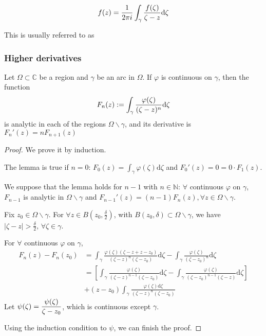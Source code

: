 \[\displaystyle f(z)=\frac{1}{2\pi i}\int_\gamma\frac{f(\zeta)}{\zeta-z}\mathrm{d}\zeta\]

This is usually referred to as 

\subsubsection{Higher derivatives}
\begin{lemma}\label{Lemma of Analytic Properties of integral function}\label{lemma in section 2.3}
    Let  $ \Omega\subset\mathbb{C}$ be a region and  $ \gamma $ be an arc in  $ \Omega $. If  $ \varphi $ is continuous on  $ \gamma $, then the function 
    \[F_n(z):=\displaystyle\int_\gamma\frac{\varphi(\zeta)}{(\zeta-z)^n}\mathrm{d}\zeta\]
    is analytic in each of the regions  $ \Omega\backslash \gamma $, and its derivative is  $ F_n'(z)=nF_{n+1}(z) $
\end{lemma}
\begin{proof}
    We prove it by induction. 
    
    The lemma is true if  $ n=0 $:  $ F_0(z)=\int_\gamma\varphi(\zeta)\mathrm{d}\zeta $ and  $ F_0'(z)=0=0\cdot F_1(z) $.
    
    We suppose that the lemma holds for  $ n-1 $ with  $ n\in \mathbb{N} $:  $ \forall  $ continuous $ \varphi $ on  $ \gamma $,  $ F_{n-1} $ is analytic in  $ \Omega\backslash \gamma $ and  $ F_{n-1}'
    (z)=(n-1)F_n(z),\forall z\in \Omega\backslash \gamma $.
    
    Fix  $ z_0\in \Omega\backslash \gamma $. For  $ \forall z\in B(z_0,\frac{\delta}{2}) $, with  $ B(z_0,\delta)\subset \Omega\backslash \gamma $, we have  $ |\zeta-z|>\frac{\delta}{2},\,\forall \zeta\in \gamma $.
    
    For  $ \forall  $ continuous  $ \varphi $ on  $ \gamma $,  
    \begin{align*}
        F_n(z)-F_n(z_0)&=\int_\gamma \frac{\varphi(\zeta)(\zeta-z+z-z_0)}{(\zeta-z)^n(\zeta-z_0)} \mathrm{d}\zeta-\int_\gamma\frac{\varphi(\zeta)}{(\zeta-z_0)^n}\mathrm{d}\zeta\\
        &=\left[
        \int_\gamma\frac{\varphi(\zeta)}{(\zeta-z)^{n-1}(\zeta-z_0)}\mathrm{d}\zeta-\int_\gamma\frac{\varphi(\zeta)}{(\zeta-z_0)^{n-1}(\zeta-z)} \mathrm{d}\zeta
    \right]\\
    &+(z-z_0)\int_\gamma\frac{\varphi(\zeta)\mathrm{d}\zeta}{(\zeta-z)^n(\zeta-z_0)}
    \end{align*}   
    Let  $ \psi(\zeta)=\displaystyle\frac{\psi(\zeta)}{\zeta-z_0} $, which is continuous except  $ \gamma $. 
    
    Using the induction condition to  $ \psi $, we can finish the proof. 
\end{proof}